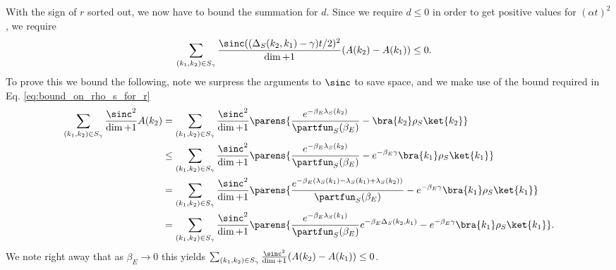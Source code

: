     With the sign of $r$ sorted out, we now have to bound the summation for $d$. Since we require $d \leq 0$ in order to get positive values for $(\alpha t)^2 $, we require
    \begin{align}
        \sum_{(k_1, k_2) \in S_{\gamma}} \frac{\sinc((\Delta_S(k_2, k_1) - \gamma)t/2)^2}{\dim + 1} (A(k_2) - A(k_1)) &\leq 0.
    \end{align}
    To prove this we bound the following, note we surpress the arguments to $\sinc$ to save space, and we make use of the bound required in Eq. \eqref{eq:bound_on_rho_s_for_r}
    \begin{align}
        \sum_{(k_1, k_2) \in S_{\gamma}} \frac{\sinc^2}{\dim + 1} A(k_2) &= \sum_{(k_1, k_2) \in S_{\gamma}} \frac{\sinc^2}{\dim + 1} \parens{\frac{e^{-\beta_E \lambda_S(k_2)}}{\partfun_S(\beta_E)}  - \bra{k_2} \rho_S \ket{k_2}} \\
        &\leq \sum_{(k_1, k_2) \in S_{\gamma}} \frac{\sinc^2}{\dim + 1} \parens{\frac{e^{-\beta_E \lambda_S(k_2)}}{\partfun_S(\beta_E)}  - e^{-\beta_E \gamma} \bra{k_1} \rho_S \ket{k_1}} \\
        &= \sum_{(k_1, k_2) \in S_{\gamma}} \frac{\sinc^2}{\dim + 1} \parens{\frac{e^{-\beta_E (\lambda_S(k_1) - \lambda_S(k_1) + \lambda_S(k_2) )}}{\partfun_S(\beta_E)}  - e^{-\beta_E \gamma} \bra{k_1} \rho_S \ket{k_1}} \\
        &= \sum_{(k_1, k_2) \in S_{\gamma}} \frac{\sinc^2}{\dim + 1} \parens{\frac{e^{-\beta_E \lambda_S(k_1)}}{\partfun_S(\beta_E)} e^{-\beta_E \Delta_S(k_2, k_1)}  - e^{-\beta_E \gamma} \bra{k_1} \rho_S \ket{k_1}}.
    \end{align}
    We note right away that as $\beta_E \to 0$ this yields $\sum_{(k_1, k_2) \in S_{\gamma}} \frac{\sinc^2}{\dim + 1} (A(k_2) - A(k_1)) \leq 0$. 
    
